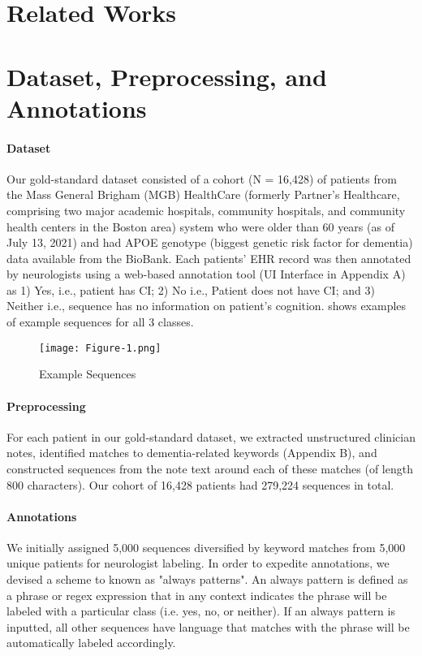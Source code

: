 \documentclass[pmlr,twocolumn,10pt]{jmlr} %
\begin{document}
\section{Related Works}
\label{sec:RelatedWorks} 

\section{Dataset, Preprocessing, and Annotations}
\label{sec:Dataset+Preprocessing+Annotations}

\paragraph{Dataset}
\label{sec:Dataset} Our gold-standard dataset consisted of a cohort (N = 16,428) of patients from the Mass General Brigham (MGB) HealthCare (formerly Partner's Healthcare, comprising two major academic hospitals, community hospitals, and community health centers in the Boston area) system who were older than 60 years (as of July 13, 2021) and had APOE genotype (biggest genetic risk factor for dementia) data available from the BioBank. Each patients' EHR record was then annotated by neurologists using a web-based annotation tool (UI Interface in Appendix A) as 1) Yes, i.e., patient has CI; 2) No i.e., Patient does not have CI; and 3) Neither i.e., sequence has no information on patient’s cognition. 
 shows examples of example sequences for all 3 classes. 

\begin{figure*}[h!]
\label{fig:fig1}
\centering 
\texttt{[image: Figure-1.png]}
\caption{Example Sequences}
\end{figure*}

\paragraph{Preprocessing}
\label{sec:Preprocessing} For each patient in our gold-standard dataset, we extracted unstructured clinician notes, identified matches to dementia-related keywords (Appendix B), and constructed sequences from the note text around each of these matches (of length 800 characters). Our cohort of 16,428 patients had 279,224 sequences in total. 

\paragraph{Annotations}
\label{sec:Annotations} We initially assigned 5,000 sequences diversified by keyword matches from 5,000 unique patients for neurologist labeling. In order to expedite annotations, we devised a scheme to known as "always patterns". An always pattern is defined as a phrase or regex expression that in any context indicates the phrase will be labeled with a particular class (i.e. yes, no, or neither). If an always pattern is inputted, all other sequences have language that matches with the phrase will be automatically labeled accordingly.
\end{document}
